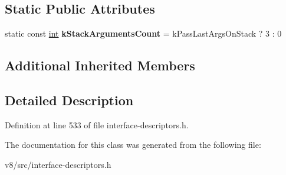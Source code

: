 \subsection*{Static Public Attributes}
\begin{DoxyCompactItemize}
\item 
\mbox{\label{classv8_1_1internal_1_1StoreTransitionDescriptor_a36ecafbd3a6609d4016f8629a83a706e}} 
static const \mbox{\hyperlink{classint}{int}} {\bfseries k\+Stack\+Arguments\+Count} = k\+Pass\+Last\+Args\+On\+Stack ? 3 \+: 0
\end{DoxyCompactItemize}
\subsection*{Additional Inherited Members}


\subsection{Detailed Description}


Definition at line 533 of file interface-\/descriptors.\+h.



The documentation for this class was generated from the following file\+:\begin{DoxyCompactItemize}
\item 
v8/src/interface-\/descriptors.\+h\end{DoxyCompactItemize}
